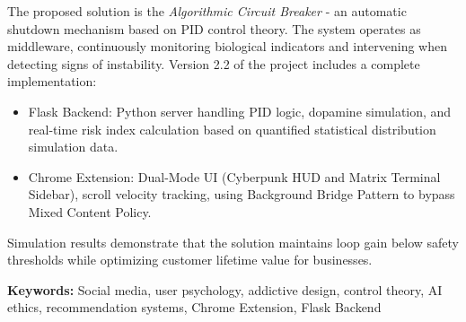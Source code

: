 The proposed solution is the \textit{Algorithmic Circuit Breaker} - an automatic shutdown mechanism based on PID control theory. The system operates as middleware, continuously monitoring biological indicators and intervening when detecting signs of instability. Version 2.2 of the project includes a complete implementation:
\begin{itemize}
    \item Flask Backend: Python server handling PID logic, dopamine simulation, and real-time risk index calculation based on quantified statistical distribution simulation data.
    \item Chrome Extension: Dual-Mode UI (Cyberpunk HUD and Matrix Terminal Sidebar), scroll velocity tracking, using Background Bridge Pattern to bypass Mixed Content Policy.
\end{itemize}

Simulation results demonstrate that the solution maintains loop gain below safety thresholds while optimizing customer lifetime value for businesses.

\textbf{Keywords:} Social media, user psychology, addictive design, control theory, AI ethics, recommendation systems, Chrome Extension, Flask Backend

\newpage
